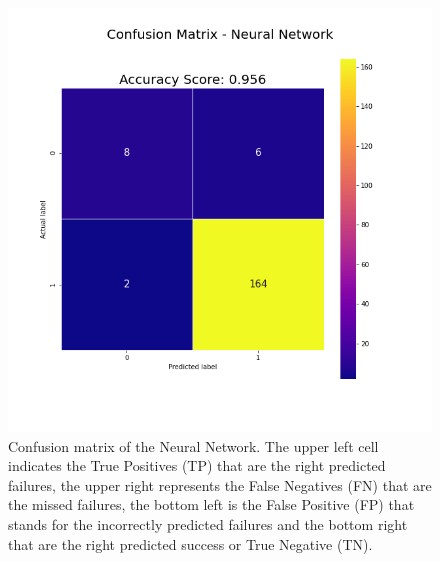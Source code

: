 \documentclass[english,notitlepage,reprint,nofootinbib]{revtex4-1}  %
\begin{document}
\begin{figure}[h]
    \centering 
    \includegraphics[scale=0.3]{results/confusionmatrix_nn.png}
    \caption{Confusion matrix of the Neural Network. The upper left cell indicates the True Positives (TP) that are the right predicted failures, the upper right represents the False Negatives (FN) that are the missed failures, the bottom left is the False Positive (FP) that stands for the incorrectly predicted failures and the bottom right that are the right predicted success or True Negative (TN).}
    \label{res:cf_nn}
\end{figure}
\end{document}

